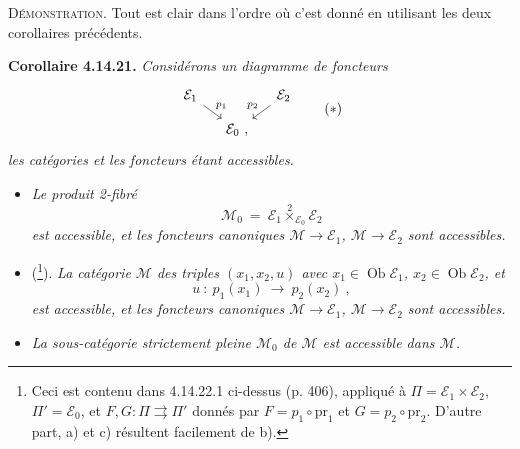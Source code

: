 \documentclass[11pt]{article}
\newcommand{\msp}[1]{\marginpar{\footnotesize [#1]}}
\newcommand{\Ob}{\operatorname{Ob}}
\newcommand{\pr}{\mathrm{pr}}
\begin{document}
\textsc{Démonstration}. Tout est clair dans l’ordre où c’est donné en utilisant les deux corollaires précédents.

\textbf{Corollaire 4.14.21.} \textit{Considérons un diagramme de foncteurs}
\[
\begin{tikzcd}[column sep=small, row sep=small]
\mathcal{E}_1 \arrow[dr, "p_1"] & & \mathcal{E}_2 \arrow[dl, "p_2"'] \\
& \mathcal{E}_0 \ , &
\end{tikzcd}
\tag*{$(*)$}
\]
\textit{les catégories et les foncteurs étant accessibles.}

\msp{page 397}
\begin{itemize}[leftmargin=2.5em]
\item[\textit{a)}] \textit{Le produit 2-fibré}
\[
\mathcal{M}_0 \ = \ \mathcal{E}_1 \overset{2}{\times}_{\mathcal{E}_0} \mathcal{E}_2
\]
\textit{est accessible, et les foncteurs canoniques $\mathcal{M} \longrightarrow \mathcal{E}_1$, $\mathcal{M} \longrightarrow \mathcal{E}_2$ sont accessibles.} %
\item[\textit{b)}] (\footnote[169]{Ceci est contenu dans 4.14.22.1 ci-dessus (p. 406), appliqué à $\Pi = \mathcal{E}_1{\times}\mathcal{E}_2$, $\Pi' = \mathcal{E}_0$, et $F, G : \Pi \rightrightarrows \Pi'$ donnés par $F = p_1\circ\pr_1$ et $G = p_2\circ\pr_2$. D’autre part, a) et c) résultent facilement de b).}). \textit{La catégorie $\mathcal{M}$ des triples $(x_1,x_2,u)$ avec $x_1 \in \Ob\mathcal{E}_1$, $x_2 \in \Ob\mathcal{E}_2$, et}
\[
u \ : \ p_1(x_1) \ \longrightarrow \ p_2(x_2) \ ,
\]
\textit{est accessible, et les foncteurs canoniques $\mathcal{M} \longrightarrow \mathcal{E}_1$, $\mathcal{M} \longrightarrow \mathcal{E}_2$ sont accessibles.}
\item[\textit{c)}] \textit{La sous-catégorie strictement pleine $\mathcal{M}_0$ de $\mathcal{M}$ est accessible dans $\mathcal{M}$.}
\end{itemize}
\end{document}
